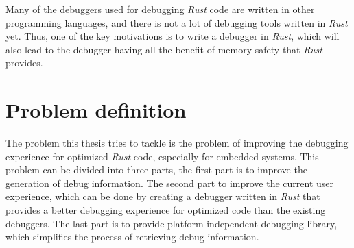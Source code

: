 Many of the debuggers used for debugging \emph{Rust} code are written in other programming languages, and there is not a lot of debugging tools written in \emph{Rust} yet.
Thus, one of the key motivations is to write a debugger in \emph{Rust}, which will also lead to the debugger having all the benefit of memory safety that \emph{Rust} provides.





\section{Problem definition}
 

The problem this thesis tries to tackle is the problem of improving the debugging experience for optimized \emph{Rust} code, especially for embedded systems.
This problem can be divided into three parts, the first part is to improve the generation of debug information.
The second part to improve the current user experience, which can be done by creating a debugger written in \emph{Rust} that provides a better debugging experience for optimized code than the existing debuggers.
The last part is to provide platform independent debugging library, which simplifies the process of retrieving debug information.


